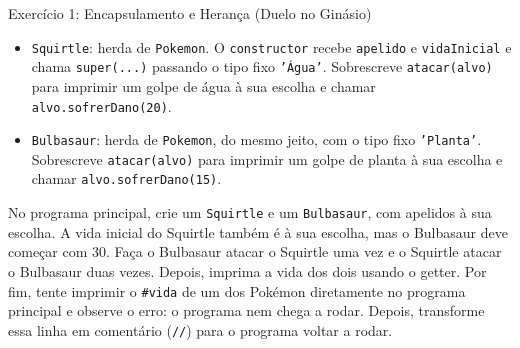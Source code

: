\begin{exercicio}{Exercício 1: Encapsulamento e Herança (Duelo no Ginásio)}
\begin{itemize}
    \item \texttt{Squirtle}: herda de \texttt{Pokemon}. O \texttt{constructor} recebe
    \texttt{apelido} e \texttt{vidaInicial} e chama \texttt{super(...)} passando o tipo fixo
    \texttt{'Água'}. Sobrescreve \texttt{atacar(alvo)} para imprimir um golpe de água à sua
    escolha e chamar \texttt{alvo.sofrerDano(20)}.

    \item \texttt{Bulbasaur}: herda de \texttt{Pokemon}, do mesmo jeito, com o tipo fixo
    \texttt{'Planta'}. Sobrescreve \texttt{atacar(alvo)} para imprimir um golpe de planta à sua
    escolha e chamar \texttt{alvo.sofrerDano(15)}.
\end{itemize}

No programa principal, crie um \texttt{Squirtle} e um \texttt{Bulbasaur}, com apelidos à sua
escolha. A vida inicial do Squirtle também é à sua escolha, mas o Bulbasaur deve começar com
30. Faça o Bulbasaur atacar o Squirtle uma vez e o Squirtle atacar o Bulbasaur duas vezes.
Depois, imprima a vida dos dois usando o getter. Por fim, tente imprimir o \texttt{\#vida} de
um dos Pokémon diretamente no programa principal e observe o erro: o programa nem chega a
rodar. Depois, transforme essa linha em comentário (\texttt{//}) para o programa voltar a
rodar.
\end{exercicio}

